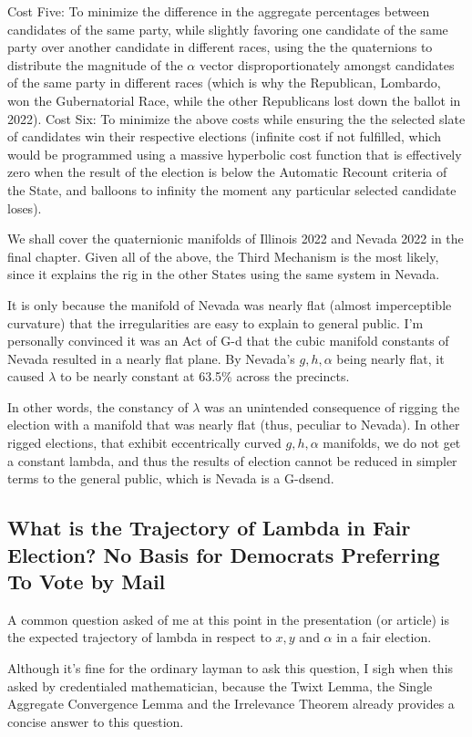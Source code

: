 \documentclass[preprint,13pt]{elsarticle}
\begin{document}
Cost Five: To minimize the difference in the aggregate percentages between candidates of the same party, while slightly favoring one candidate of the same party over another candidate in different races, using the the quaternions to distribute the magnitude of the $\alpha$ vector disproportionately amongst candidates of the same party in different races (which is why the Republican, Lombardo, won the Gubernatorial Race, while the other Republicans lost down the ballot in 2022).
\newpage
Cost Six: To minimize the above costs while ensuring the the selected slate of candidates win their respective elections (infinite cost if not fulfilled, which would be programmed using a massive hyperbolic cost function that is effectively zero when the result of the election is below the Automatic Recount criteria of the State, and balloons to infinity the moment any particular selected candidate loses).

We shall cover the quaternionic manifolds of Illinois 2022 and Nevada 2022 in the final chapter. Given all of the above, the Third Mechanism is the most likely, since it explains the rig in the other States using the same system in Nevada. 

It is only because the manifold of Nevada was nearly flat (almost imperceptible curvature) that the irregularities are easy to explain to general public. I'm personally convinced it was an Act of G-d that the cubic manifold constants of Nevada resulted in a nearly flat plane. By Nevada's $g,h,\alpha$ being nearly flat, it caused $\lambda$ to be nearly constant at 63.5\% across the precincts. 

In other words, the constancy of $\lambda$ was an unintended consequence of rigging the election with a manifold that was nearly flat (thus, peculiar to Nevada). In other rigged elections, that exhibit eccentrically curved $g,h,\alpha$ manifolds, we do not get a constant lambda, and thus the results of election cannot be reduced in simpler terms to the general public, which is Nevada is a G-dsend.
\newpage
\subsection{What is the Trajectory of Lambda in Fair Election? No Basis for Democrats Preferring To Vote by Mail}
A common question asked of me at this point in the presentation (or article) is the expected trajectory of lambda in respect to $x,y$ and $\alpha$ in a fair election. 

Although it's fine for the ordinary layman to ask this question, I sigh when this asked by credentialed mathematician, because the Twixt Lemma, the Single Aggregate Convergence Lemma and the Irrelevance Theorem already provides a concise answer to this question.
\end{document}
